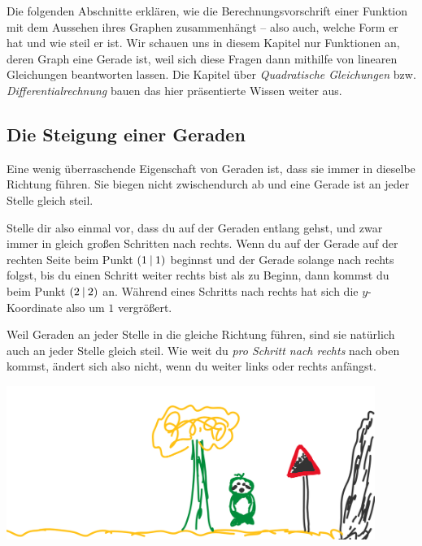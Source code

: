 \documentclass[../../main.tex]{subfiles}
\begin{document}
Die folgenden Abschnitte erklären, wie die Berechnungsvorschrift einer Funktion mit dem Aussehen ihres Graphen zusammenhängt -- also auch, welche Form er hat und wie steil er ist. Wir schauen uns in diesem Kapitel nur Funktionen an, deren Graph eine Gerade ist, weil sich diese Fragen dann mithilfe von linearen Gleichungen beantworten lassen. Die Kapitel über \emph{Quadratische Gleichungen} bzw. \emph{Differentialrechnung} bauen das hier präsentierte Wissen weiter aus.

\subsection{Die Steigung einer Geraden}
\label{sec:steigung-von-geraden}

Eine wenig überraschende Eigenschaft von Geraden ist, dass sie immer in dieselbe Richtung führen. Sie biegen nicht zwischendurch ab und eine Gerade ist an jeder Stelle gleich steil.

Stelle dir also einmal vor, dass du auf der Geraden entlang gehst, und zwar immer in gleich großen Schritten nach rechts. Wenn du auf der Gerade auf der rechten Seite beim Punkt $\left(1 \:\middle|\: 1\right)$ beginnst und der Gerade solange nach rechts folgst, bis du einen Schritt weiter rechts bist als zu Beginn, dann kommst du beim Punkt $\left(2 \:\middle|\: 2\right)$ an. Während eines Schritts nach rechts hat sich die $y$-Koordinate also um $1$ vergrößert.

Weil Geraden an jeder Stelle in die gleiche Richtung führen, sind sie natürlich auch an jeder Stelle gleich steil. Wie weit du \emph{pro Schritt nach rechts} nach oben kommst, ändert sich also nicht, wenn du weiter links oder rechts anfängst.

\begin{center}
    \includegraphics[height=5cm]{images/slope.png}
\end{center}
\end{document}
